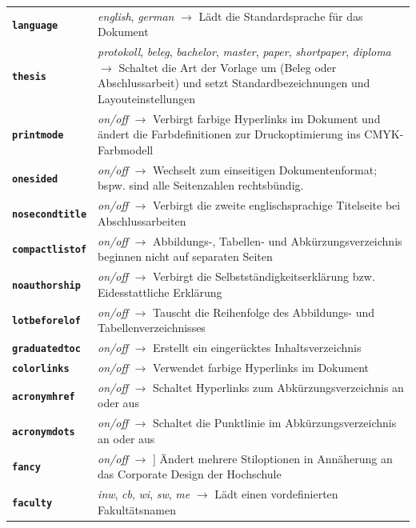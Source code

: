 \begin{tabular}{lp{}}
\textbf{\texttt{language}} & \textit{english}, \textit{german} $\rightarrow$ Lädt die Standardsprache für das Dokument \\

\textbf{\texttt{thesis}} & \textit{protokoll}, \textit{beleg}, \textit{bachelor}, \textit{master}, \textit{paper}, \textit{shortpaper}, \textit{diploma} $\rightarrow$ Schaltet die Art der Vorlage um (Beleg oder Abschlussarbeit) und setzt Standardbezeichnungen und Layouteinstellungen\\

\textbf{\texttt{printmode}} & \textit{on/off} $\rightarrow$ Verbirgt farbige Hyperlinks im Dokument und ändert die Farbdefinitionen zur Druckoptimierung ins CMYK-Farbmodell \\

\textbf{\texttt{onesided}} & \textit{on/off} $\rightarrow$ Wechselt zum einseitigen Dokumentenformat; bspw. sind alle Seitenzahlen rechtsbündig. \\

\textbf{\texttt{nosecondtitle}} & \textit{on/off} $\rightarrow$ Verbirgt die zweite englischsprachige Titelseite bei Abschlussarbeiten \\

\textbf{\texttt{compactlistof}} & \textit{on/off} $\rightarrow$ Abbildungs-, Tabellen- und Abkürzungsverzeichnis beginnen nicht auf separaten Seiten \\

\textbf{\texttt{noauthorship}} & \textit{on/off} $\rightarrow$ Verbirgt die Selbstständigkeitserklärung bzw. Eidesstattliche Erklärung \\

\textbf{\texttt{lotbeforelof}} & \textit{on/off} $\rightarrow$ Tauscht die Reihenfolge des Abbildungs- und Tabellenverzeichnisses \\

\textbf{\texttt{graduatedtoc}} & \textit{on/off} $\rightarrow$ Erstellt ein eingerücktes Inhaltsverzeichnis \\

\textbf{\texttt{colorlinks}} & \textit{on/off} $\rightarrow$ Verwendet farbige Hyperlinks im Dokument \\

\textbf{\texttt{acronymhref}} & \textit{on/off} $\rightarrow$ Schaltet Hyperlinks zum Abkürzungsverzeichnis an oder aus \\

\textbf{\texttt{acronymdots}} & \textit{on/off} $\rightarrow$ Schaltet die Punktlinie im Abkürzungsverzeichnis an oder aus \\

\textbf{\texttt{fancy}} & \textit{on/off} $\rightarrow$ ] Ändert mehrere Stiloptionen in Annäherung an das Corporate Design der Hochschule \\

\textbf{\texttt{faculty}} & \textit{inw}, \textit{cb}, \textit{wi}, \textit{sw}, \textit{me} $\rightarrow$  Lädt einen vordefinierten Fakultätsnamen \\

\end{tabular}

